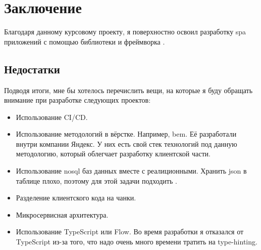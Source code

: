 \section{Заключение}
Благодаря данному курсовому проекту, я поверхностно освоил разработку \acrshort{spa} приложений с помощью библиотеки \textcite{react} и фреймворка \textcite{express}.

\subsection{Недостатки}
Подводя итоги, мне бы хотелось перечислить вещи, на которые я буду обращать внимание при разработке следующих проектов:
\begin{itemize}
    \item Использование CI/CD.
    \item Использование методологий в вёрстке. Например, \acrfull{bem}. Её разработали внутри компании Яндекс. У них есть свой стек технологий под данную методологию, который облегчает разработку клиентской части.
    \item Использование \acrshort{nosql} баз данных вместе с реалиционными. Хранить \acrshort{json} в таблице плохо, поэтому для этой задачи подходить \textcite{mongodb}.
    \item Разделение клиентского кода на чанки.
    \item Микросервисная архитектура.
    \item Использование TypeScript или Flow. Во время разработки я отказался от TypeScript из-за того, что надо очень много времени тратить на type-hinting.
\end{itemize}

\clearpage
